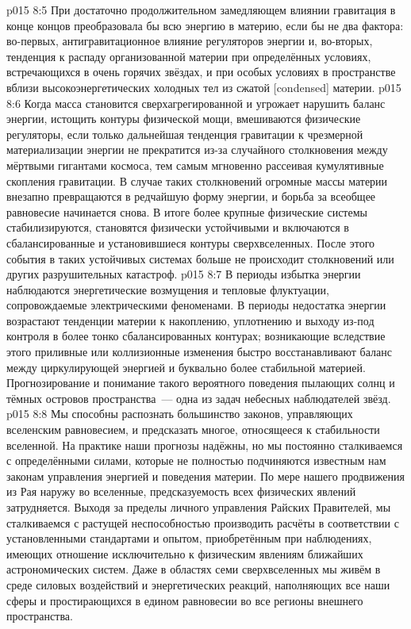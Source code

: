 \vs p015 8:5 При достаточно продолжительном замедляющем влиянии гравитация в конце концов преобразовала бы всю энергию в материю, если бы не два фактора: во\hyp{}первых, антигравитационное влияние регуляторов энергии и, во\hyp{}вторых, тенденция к распаду организованной материи при определённых условиях, встречающихся в очень горячих звёздах, и при особых условиях в пространстве вблизи высокоэнергетических холодных тел из сжатой [condensed] материи.
\vs p015 8:6 Когда масса становится сверхагрегированной и угрожает нарушить баланс энергии, истощить контуры физической мощи, вмешиваются физические регуляторы, если только дальнейшая тенденция гравитации к чрезмерной материализации энергии не прекратится из\hyp{}за случайного столкновения между мёртвыми гигантами космоса, тем самым мгновенно рассеивая кумулятивные скопления гравитации. В случае таких столкновений огромные массы материи внезапно превращаются в редчайшую форму энергии, и борьба за всеобщее равновесие начинается снова. В итоге более крупные физические системы стабилизируются, становятся физически устойчивыми и включаются в сбалансированные и установившиеся контуры сверхвселенных. После этого события в таких устойчивых системах больше не происходит столкновений или других разрушительных катастроф.
\vs p015 8:7 В периоды избытка энергии наблюдаются энергетические возмущения и тепловые флуктуации, сопровождаемые электрическими феноменами. В периоды недостатка энергии возрастают тенденции материи к накоплению, уплотнению и выходу из\hyp{}под контроля в более тонко сбалансированных контурах; возникающие вследствие этого приливные или коллизионные изменения быстро восстанавливают баланс между циркулирующей энергией и буквально более стабильной материей. Прогнозирование и понимание такого вероятного поведения пылающих солнц и тёмных островов пространства~--- одна из задач небесных наблюдателей звёзд.
\vs p015 8:8 Мы способны распознать большинство законов, управляющих вселенским равновесием, и предсказать многое, относящееся к стабильности вселенной. На практике наши прогнозы надёжны, но мы постоянно сталкиваемся с определёнными силами, которые не полностью подчиняются известным нам законам управления энергией и поведения материи. По мере нашего продвижения из Рая наружу во вселенные, предсказуемость всех физических явлений затрудняется. Выходя за пределы личного управления Райских Правителей, мы сталкиваемся с растущей неспособностью производить расчёты в соответствии с установленными стандартами и опытом, приобретённым при наблюдениях, имеющих отношение исключительно к физическим явлениям ближайших астрономических систем. Даже в областях семи сверхвселенных мы живём в среде силовых воздействий и энергетических реакций, наполняющих все наши сферы и простирающихся в едином равновесии во все регионы внешнего пространства.
